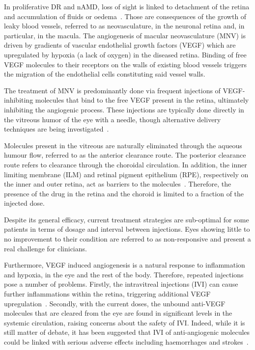 \documentclass[12pt,a4paper]{journal}
\begin{document}
In proliferative DR and nAMD, loss of sight is linked to detachment of the retina and accumulation of fluids or oedema~\cite{Roberts_2020, Waldstein_2016}.
Those are consequences of the growth of leaky blood vessels, referred to as neovasculature, in the neuronal retina and, in particular, in the macula.
The angiogenesis of macular neovasculature (MNV) is driven by gradients of vascular endothelial growth factors (VEGF) which are upregulated by hypoxia (a lack of oxygen) in the diseased retina.
Binding of free VEGF molecules to their receptors on the walls of existing blood vessels triggers the migration of the endothelial cells constituting said vessel walls.

The treatment of MNV is predominantly done via frequent injections of VEGF-inhibiting molecules that bind to the free VEGF present in the retina, ultimately inhibiting the angiogenic process.
These injections are typically done directly in the vitreous humor of the eye with a needle, though alternative delivery techniques are being investigated~\cite{Kim_2021}.

Molecules present in the vitreous are naturally eliminated through the aqueous humour flow, referred to as the anterior clearance route.
The posterior clearance route refers to clearance through the choroidal circulation.
In addition, the inner limiting membrane (ILM) and retinal pigment epithelium (RPE), respectively on the inner and outer retina, act as barriers to the molecules~\cite{Park_2015}.
Therefore, the presence of the drug in the retina and the choroid is limited to a fraction of the injected dose. 

Despite its general efficacy, current treatment strategies are sub-optimal for some patients in terms of dosage and interval between injections.
Eyes showing little to no improvement to their condition are referred to as non-responsive and present a real challenge for clinicians.

Furthermore, VEGF induced angiogenesis is a natural response to inflammation and hypoxia, in the eye and the rest of the body. 
Therefore, repeated injections pose a number of problems.
Firstly, the intravitreal injections (IVI) can cause further inflammations within the retina, triggering additional VEGF upregulation~\cite{Iyer_2022}.
Secondly, with the current doses, the unbound anti-VEGF molecules that are cleared from the eye are found in significant levels in the systemic circulation, raising concerns about the safety of IVI.
Indeed, while it is still matter of debate, it has been suggested that IVI of anti-angiogenic molecules could be linked with serious adverse effects including haemorrhages and strokes~\cite{Avery_2016, Kaiser_2019, Maloney_2021}.
\end{document}
